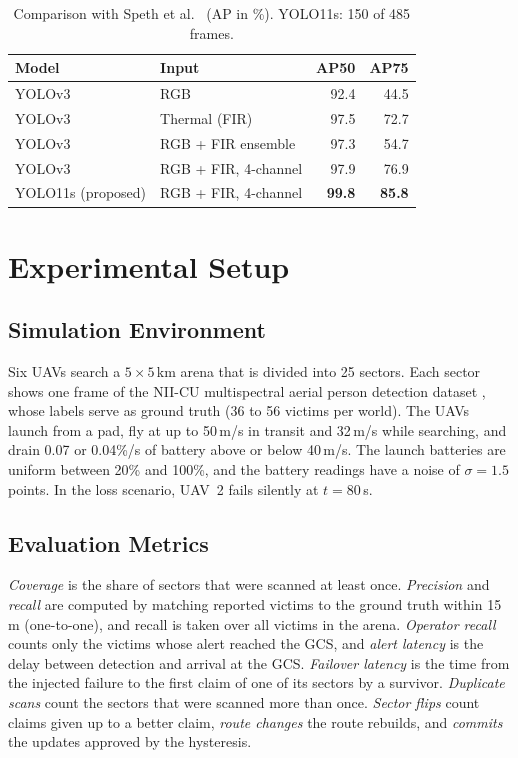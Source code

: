 \documentclass[conference]{IEEEtran}
\begin{document}
\begin{table}[!t]
\centering
\caption{Comparison with Speth et al.\ \cite{speth2022} (AP in \%). YOLO11s: 150 of 485 frames.}
\label{tab:speth}
\footnotesize
\begin{tabular}{llrr}
\toprule
Model & Input & AP50 & AP75\\
\midrule
YOLOv3 \cite{speth2022} & RGB & 92.4 & 44.5\\
YOLOv3 \cite{speth2022} & Thermal (FIR) & 97.5 & 72.7\\
YOLOv3 \cite{speth2022} & RGB + FIR ensemble & 97.3 & 54.7\\
YOLOv3 \cite{speth2022} & RGB + FIR, 4-channel & 97.9 & 76.9\\
YOLO11s (proposed) & RGB + FIR, 4-channel & \textbf{99.8} & \textbf{85.8}\\
\bottomrule
\end{tabular}
\end{table}

\section{Experimental Setup}\label{sec:setup}
\subsection{Simulation Environment}
Six UAVs search a $5\times5$\,km arena that is divided into 25 sectors. Each sector shows one frame of the NII-CU multispectral aerial person detection dataset \cite{speth2022}, whose labels serve as ground truth (36 to 56 victims per world). The UAVs launch from a pad, fly at up to 50\,m/s in transit and 32\,m/s while searching, and drain 0.07 or 0.04\%/s of battery above or below 40\,m/s. The launch batteries are uniform between 20\% and 100\%, and the battery readings have a noise of $\sigma=1.5$ points. In the loss scenario, UAV~2 fails silently at $t=80$\,s.

\subsection{Evaluation Metrics}
\emph{Coverage} is the share of sectors that were scanned at least once. \emph{Precision} and \emph{recall} are computed by matching reported victims to the ground truth within 15\,m (one-to-one), and recall is taken over all victims in the arena. \emph{Operator recall} counts only the victims whose alert reached the GCS, and \emph{alert latency} is the delay between detection and arrival at the GCS. \emph{Failover latency} is the time from the injected failure to the first claim of one of its sectors by a survivor. \emph{Duplicate scans} count the sectors that were scanned more than once. \emph{Sector flips} count claims given up to a better claim, \emph{route changes} the route rebuilds, and \emph{commits} the updates approved by the hysteresis.
\end{document}
